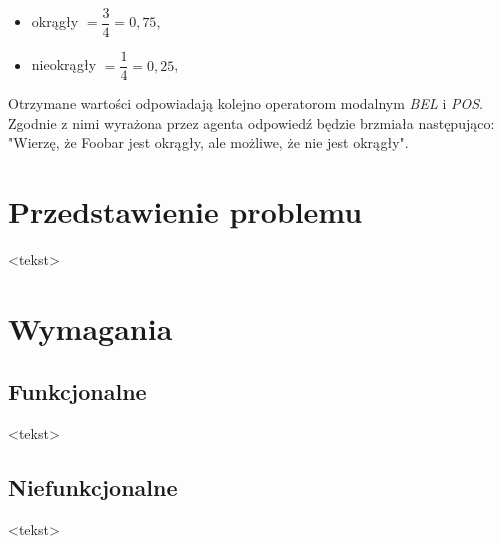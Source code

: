\begin{itemize}
	\setlength{\itemindent}{.5in}
	\item okrągły $ = \dfrac{3}{4} = 0,75 $,
	\vspace{0.1in}
	\item nieokrągły $ = \dfrac{1}{4} = 0,25 $,
\end{itemize}  

Otrzymane wartości odpowiadają kolejno operatorom modalnym \textit{BEL} i \textit{POS}. Zgodnie z nimi wyrażona przez agenta odpowiedź będzie brzmiała następująco: "Wierzę, że Foobar jest okrągły, ale możliwe, że nie jest okrągły".



\section{Przedstawienie problemu}

<tekst>


\section{Wymagania}

\subsection{Funkcjonalne}

<tekst>


\subsection{Niefunkcjonalne}

<tekst>
